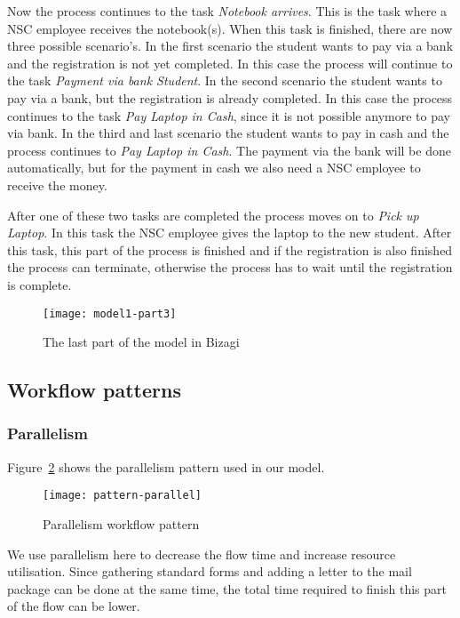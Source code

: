 Now the process continues to the task \emph{Notebook arrives}.
This is the task where a NSC employee receives the notebook(s).
When this task is finished, there are now three possible scenario's.
In the first scenario the student wants to pay via a bank and the registration is not yet completed.
In this case the process will continue to the task \emph{Payment via bank Student}.
In the second scenario the student wants to pay via a bank, but the registration is already completed.
In this case the process continues to the task \emph{Pay Laptop in Cash}, since it is not possible anymore to pay via bank.
In the third and last scenario the student wants to pay in cash and the process continues to \emph{Pay Laptop in Cash}.
The payment via the bank will be done automatically, but for the payment in cash we also need a NSC employee to receive the money.

After one of these two tasks are completed the process moves on to \emph{Pick up Laptop}.
In this task the NSC employee gives the laptop to the new student.
After this task, this part of the process is finished and if the registration is also finished the process can terminate, otherwise the process has to wait until the registration is complete.

\begin{figure}[H]
	\centering
	\texttt{[image: model1-part3]}
	\caption{The last part of the model in Bizagi}
	\label{fig:model1-part3}
\end{figure}

\subsection{Workflow patterns}
\label{sec:model1:patterns}

\subsubsection{Parallelism}

	Figure~\ref{fig:patterns:parallelism} shows the parallelism pattern used in our model.

	\begin{figure}[H]
		\centering
		\texttt{[image: pattern-parallel]}
		\caption{Parallelism workflow pattern}
		\label{fig:patterns:parallelism}
	\end{figure}

	We use parallelism here to decrease the flow time and increase resource utilisation.
	Since gathering standard forms and adding a letter to the mail package can be done at the same time, the total time required to finish this part of the flow can be lower.

